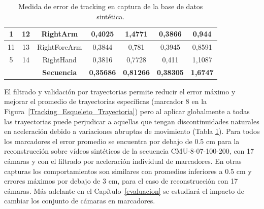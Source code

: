 \begin{table}[H]
{\begin{tabular}{|c|c|c|c|c|c|c|}
1        & 12        & RightArm           & 0,4025                                                       & 1,4771                                                       & 0,3866                                                                  & 0,944                                                                   \\ \hline
11       & 13        & RightForeArm       & 0,3844                                                       & 0,781                                                        & 0,3945                                                                  & 0,8591                                                                  \\ \hline
5        & 14        & RightHand          & 0,3816                                                       & 0,7728                                                       & 0,411                                                                   & 1,1087                                                                  \\ \hline
         &           & \textbf{Secuencia} & \textbf{0,35686}                                             & \textbf{0,81266}                                             & \textbf{0,38305}                                                        & \textbf{1,6747}                                                         \\ \hline
\end{tabular}
}
\caption{Medida de error de tracking en captura de la base de datos sintética.}
\label{tablaerrortrack}
\end{table}



El filtrado y validación por trayectorias permite reducir el error máximo y mejorar el promedio de trayectorias específicas (marcador 8 en la Figura~\ref{Tracking_Esqueleto_Trayectoria}) pero al aplicar globalmente a todas las trayectorias puede perjudicar a aquellas que tengan discontinuidades naturales en aceleración debido a variaciones abruptas de movimiento (Tabla \ref{tablaerrortrack}). Para todos los marcadores el error promedio se encuentra por debajo de 0.5 cm para la reconstrucción sobre vídeos sintéticos de la secuencia CMU-8-07-100-200, con 17 cámaras y con el filtrado por aceleración individual de marcadores. En otras capturas los comportamientos son similares con promedios inferiores a 0.5 cm y errores máximos por debajo de 3 cm, para el caso de reconstrucción con 17 cámaras. Más adelante en el Capítulo~\ref{evaluacion} se estudiará el impacto de cambiar los conjunto de cámaras en marcadores.   


